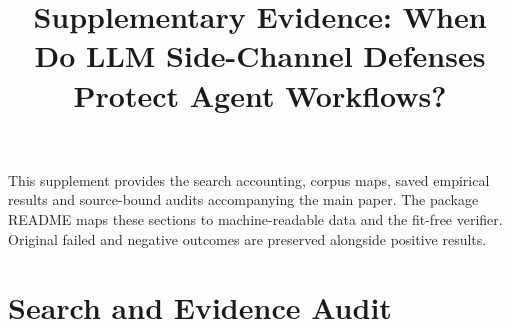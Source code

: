 \documentclass[conference,compsoc]{IEEEtran}
\title{Supplementary Evidence: When Do LLM Side-Channel Defenses Protect Agent Workflows?}
\author{}
\begin{document}
\maketitle
This supplement provides the search accounting, corpus maps, saved empirical results and source-bound audits accompanying the main paper. The package README maps these sections to machine-readable data and the fit-free verifier. Original failed and negative outcomes are preserved alongside positive results.
\section{Search and Evidence Audit}\label{app:search}



















\end{document}
